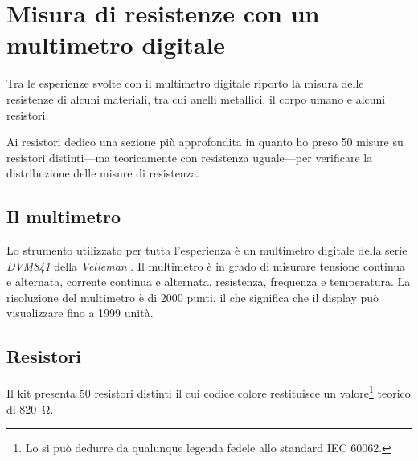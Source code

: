 \chapter{Misura di resistenze con un multimetro digitale}\label{ch:mult}
    Tra le esperienze svolte con il multimetro digitale riporto la misura delle resistenze di alcuni materiali, tra cui anelli metallici, il corpo umano e alcuni resistori.

    Ai resistori dedico una sezione più approfondita in quanto ho preso \num{50} misure su resistori distinti---ma teoricamente con resistenza uguale---per verificare la distribuzione delle misure di resistenza.

    \section{Il multimetro}
        Lo strumento utilizzato per tutta l'esperienza è un multimetro digitale della serie \emph{DVM841} della \emph{Velleman\textsuperscript{\textregistered}} \cite{velleman-dvm841}. Il multimetro è in grado di misurare tensione continua e alternata, corrente continua e alternata, resistenza, frequenza e temperatura. La risoluzione del multimetro è di \num{2000} punti, il che significa che il display può visualizzare fino a \num{1999} unità.
    \section{Resistori}
        Il kit presenta \num{50} resistori distinti il cui codice colore restituisce un valore\footnote{Lo si può dedurre da qualunque legenda fedele allo standard IEC 60062.} teorico di \SI{820}{\ohm}.